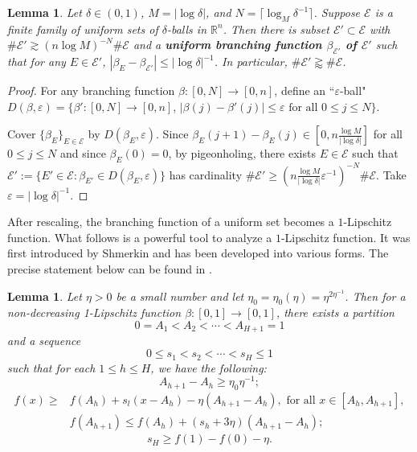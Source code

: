 \documentclass{amsart}
\numberwithin{equation}{section}
\newtheorem{lemma}[theorem]{Lemma}
\newcommand{\be}{\beta}
\newcommand{\de}{\delta}
\newcommand{\e}{\varepsilon}
\newcommand{\ce}{\mathcal E}
\newcommand{\ZR}{\mathbb{R}}
\begin{document}
\begin{lemma}
\label{uniform-sets-branching-lem}
Let $\delta\in(0,1)$, $M=|\log\de|$, and  $N=\lceil \log_M \delta^{-1} \rceil$.
Suppose $\ce$ is a finite family of uniform sets of $\de$-balls in $\ZR^n$.
Then there is subset $\ce'\subset\ce$ with $\# \ce'\gtrsim (n \log M)^{-N}\#\ce $ 
and a {\bf uniform branching function $\be_{\ce'}$ of $\ce'$} such that for any $E\in\ce'$, $|\be_{E}-\be_{\ce'}|\leq  |\log \delta|^{-1}$.    
In particular, $\#\ce'\gtrapprox\#\ce$.

\end{lemma}
\begin{proof} 
For any branching function $\beta: [0, N]\rightarrow [0,n]$, define an ``$\e$-ball" $D(\beta, \e)=\{ \beta': [0, N]\rightarrow [0,n]$, $|\beta(j)- \beta'(j)| \leq \e \text{ for all }0\leq j\leq N\}$. 
    
    
Cover $\{\beta_E \}_{E\in \ce}$ by $D(\beta_E, \e)$. Since $\be_E(j+1)-\be_E(j)\in[0,n\frac{\log M}{|\log \delta|}]$ for all $0\leq j\leq N$ and since $\be_E(0)=0$, by pigeonholing, there exists $E\in \ce$ such that $\ce':=\{ E'\in \ce: \beta_{E'}\in D(\beta_E, \e) \}$ has cardinality $\#\ce' \geq  (n \frac{\log M}{|\log \delta|} \e^{-1})^{-N} \#\ce$. Take $\e= |\log \delta|^{-1}$.
\end{proof}



After rescaling, the branching function of a uniform set becomes a $1$-Lipschitz function. 
What follows is a powerful tool to analyze a $1$-Lipschitz function.
It was first introduced by Shmerkin \cite{shmerkin2023non} and has been developed into various forms.
The precise statement below can be found in \cite{Demeter-Wang}. 

\begin{lemma}
\label{lip-decomposition}
Let $\eta>0$ be a small number and let $\eta_0=\eta_0(\eta)=\eta^{2\eta^{-1}}$. Then for a non-decreasing 1-Lipschitz function $\be:[0,1]\to[0,1]$, there exists a partition
\begin{equation}
    0=A_1<A_2<\cdots<A_{H+1}=1
\end{equation}
and a sequence 
\begin{equation}
    0\leq s_1< s_2<\cdots< s_{H}\leq 1
\end{equation}
such that for each $1\leq h\leq H$, we have the following:
\begin{equation}
    A_{h+1}-A_h\geq\eta_0\eta^{-1};
\end{equation}
\begin{align}
    f(x)\geq& f(A_h)+s_l(x-A_h)-\eta(A_{h+1}-A_h), \text{ for all }x\in[A_h,A_{h+1}],\\
    &f(A_{h+1})\leq f(A_h)+(s_h+3\eta)(A_{h+1}-A_h);
\end{align}
\begin{equation}
    s_H\geq f(1)-f(0)-\eta.
\end{equation}
\end{lemma}
\end{document}
